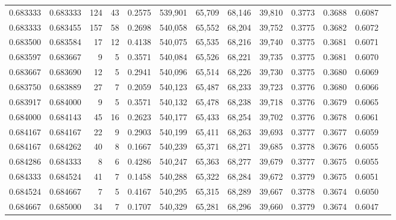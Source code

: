 \begin{tabular}{rrrrrrrrrrrrr}
0.683333 & 0.683333 &   124 &  43 &                                     0.2575 & 539,901 &  65,709 &  68,146 &  39,810 & 0.3773 & 0.3688 & 0.6087 \\
0.683333 & 0.683455 &   157 &  58 &                                     0.2698 & 540,058 &  65,552 &  68,204 &  39,752 & 0.3775 & 0.3682 & 0.6072 \\
0.683500 & 0.683584 &    17 &  12 &                                     0.4138 & 540,075 &  65,535 &  68,216 &  39,740 & 0.3775 & 0.3681 & 0.6071 \\
0.683597 & 0.683667 &     9 &   5 &                                     0.3571 & 540,084 &  65,526 &  68,221 &  39,735 & 0.3775 & 0.3681 & 0.6070 \\
0.683667 & 0.683690 &    12 &   5 &                                     0.2941 & 540,096 &  65,514 &  68,226 &  39,730 & 0.3775 & 0.3680 & 0.6069 \\
0.683750 & 0.683889 &    27 &   7 &                                     0.2059 & 540,123 &  65,487 &  68,233 &  39,723 & 0.3776 & 0.3680 & 0.6066 \\
0.683917 & 0.684000 &     9 &   5 &                                     0.3571 & 540,132 &  65,478 &  68,238 &  39,718 & 0.3776 & 0.3679 & 0.6065 \\
0.684000 & 0.684143 &    45 &  16 &                                     0.2623 & 540,177 &  65,433 &  68,254 &  39,702 & 0.3776 & 0.3678 & 0.6061 \\
0.684167 & 0.684167 &    22 &   9 &                                     0.2903 & 540,199 &  65,411 &  68,263 &  39,693 & 0.3777 & 0.3677 & 0.6059 \\
0.684167 & 0.684262 &    40 &   8 &                                     0.1667 & 540,239 &  65,371 &  68,271 &  39,685 & 0.3778 & 0.3676 & 0.6055 \\
0.684286 & 0.684333 &     8 &   6 &                                     0.4286 & 540,247 &  65,363 &  68,277 &  39,679 & 0.3777 & 0.3675 & 0.6055 \\
0.684333 & 0.684524 &    41 &   7 &                                     0.1458 & 540,288 &  65,322 &  68,284 &  39,672 & 0.3779 & 0.3675 & 0.6051 \\
0.684524 & 0.684667 &     7 &   5 &                                     0.4167 & 540,295 &  65,315 &  68,289 &  39,667 & 0.3778 & 0.3674 & 0.6050 \\
0.684667 & 0.685000 &    34 &   7 &                                     0.1707 & 540,329 &  65,281 &  68,296 &  39,660 & 0.3779 & 0.3674 & 0.6047 \\

\end{tabular}
